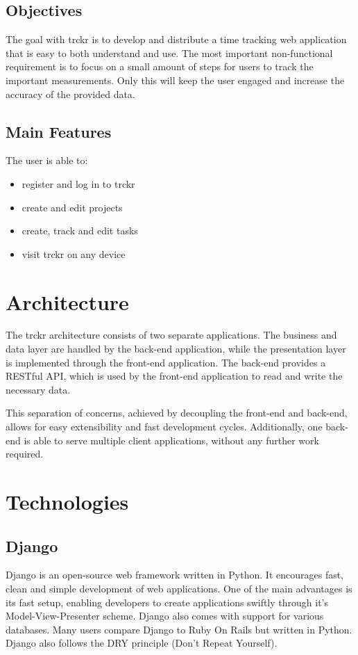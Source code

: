 \documentclass[bibliography=totoc, listof=totocnumbered]{scrartcl}
\begin{document}
\subsection{Objectives}
The goal with trckr is to develop and distribute a time tracking web application
that is easy to both understand and use. The most important non-functional
requirement is to focus on a small amount of steps for users to track the
important measurements. Only this will keep the user engaged and increase the
accuracy of the provided data.

\subsection{Main Features}
The user is able to:
\begin{itemize}
    \item register and log in to trckr
    \item create and edit projects
    \item create, track and edit tasks
    \item visit trckr on any device
\end{itemize}

\section{Architecture}
The trckr architecture consists of two separate applications. The business and
data layer are handled by the back-end application, while the presentation layer
is implemented through the front-end application. The back-end provides a
RESTful API, which is used by the front-end application to read and write the
necessary data.

This separation of concerns, achieved by decoupling the front-end and back-end,
allows for easy extensibility and fast development cycles. Additionally, one
back-end is able to serve multiple client applications, without any further work
required.

\section{Technologies}
\subsection{Django}
Django is an open-source web framework written in Python.\cite{django} It
encourages fast, clean and simple development of web applications. One of the
main advantages is its fast setup, enabling developers to create applications
swiftly through it's Model-View-Presenter scheme. Django also comes with support
for various databases. Many users compare Django to Ruby On Rails but written in
Python. Django also follows the DRY principle (Don't Repeat Yourself).
\end{document}
